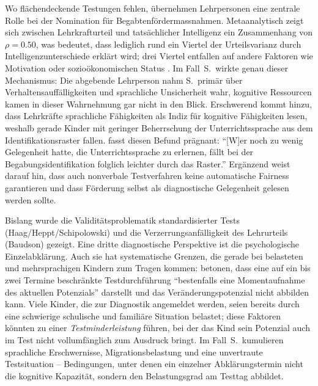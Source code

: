 \documentclass[ngerman, a4paper]{article}
\begin{document}
Wo flächendeckende Testungen fehlen, übernehmen Lehrpersonen eine zentrale
Rolle bei der Nomination für Begabtenfördermassnahmen. Metaanalytisch zeigt
sich zwischen Lehrkrafturteil und tatsächlicher Intelligenz ein Zusammenhang
von $\rho = 0.50$, was bedeutet, dass lediglich rund ein Viertel der
Urteilsvarianz durch Intelligenzunterschiede erklärt wird; drei Viertel
entfallen auf andere Faktoren wie Motivation oder sozioökonomischen Status
\parencite[S.\,118]{baudson2021wasdenken}. Im Fall~S.\ wirkte genau dieser
Mechanismus: Die abgebende Lehrperson nahm S.\ primär über
Verhaltensauffälligkeiten und sprachliche Unsicherheit wahr, kognitive
Ressourcen kamen in dieser Wahrnehmung gar nicht in den Blick. Erschwerend
kommt hinzu, dass Lehrkräfte sprachliche Fähigkeiten als Indiz für kognitive
Fähigkeiten lesen, weshalb gerade Kinder mit geringer Beherrschung der
Unterrichtssprache aus dem Identifikationsraster fallen.
\textcite[S.\,120]{baudson2021wasdenken} fasst diesen Befund prägnant:
\enquote{[W]er noch zu wenig Gelegenheit hatte, die Unterrichtssprache zu
  erlernen, fällt bei der Begabungsidentifikation folglich leichter durch das
  Raster.}
Ergänzend weist \textcite[S.\,66,\,68]{koop2025herkunft} darauf hin, dass
auch nonverbale Testverfahren keine automatische Fairness garantieren
und dass Förderung selbst als diagnostische Gelegenheit gelesen werden
sollte.

Bislang wurde die Validitätsproblematik standardisierter Tests
(Haag/Heppt/Schipolowski) und die Verzerrungsanfälligkeit des Lehrurteils
(Baudson) gezeigt. Eine dritte diagnostische Perspektive ist die
psychologische Einzelabklärung. Auch sie hat systematische Grenzen, die
gerade bei belasteten und mehrsprachigen Kindern zum Tragen kommen:
\textcite[S.\,239--249]{gauckreimann2021psychdiagnostik} betonen, dass eine
auf ein bis zwei Termine beschränkte Testdurchführung \enquote{bestenfalls
  eine Momentaufnahme des aktuellen Potenzials} darstellt und das
Veränderungspotenzial nicht abbilden kann. Viele Kinder, die zur Diagnostik
angemeldet werden, seien bereits durch eine schwierige schulische und
familiäre Situation belastet; diese Faktoren könnten zu einer
\textit{Testminderleistung} führen, bei der das Kind sein Potenzial auch im
Test nicht vollumfänglich zum Ausdruck bringt. Im Fall~S.\ kumulieren
sprachliche Erschwernisse, Migrations\-belastung und eine unvertraute
Testsituation -- Bedingungen, unter denen ein einzelner Abklärungstermin
nicht die kognitive Kapazität, sondern den Belastungsgrad am Testtag
abbildet.
\end{document}
